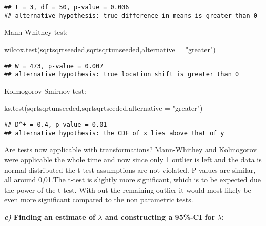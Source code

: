\documentclass[
]{article}
\newenvironment{Shaded}{\begin{snugshade}}{\end{snugshade}}
\newcommand{\AttributeTok}[1]{\textcolor[rgb]{0.77,0.63,0.00}{#1}}
\newcommand{\FunctionTok}[1]{\textcolor[rgb]{0.00,0.00,0.00}{#1}}
\newcommand{\NormalTok}[1]{#1}
\newcommand{\StringTok}[1]{\textcolor[rgb]{0.31,0.60,0.02}{#1}}
\begin{document}
\begin{verbatim}
## t = 3, df = 50, p-value = 0.006
## alternative hypothesis: true difference in means is greater than 0
\end{verbatim}

Mann-Whitney test:

\begin{Shaded}
\begin{Highlighting}[]
\FunctionTok{wilcox.test}\NormalTok{(sqrtsqrtseeded,sqrtsqrtunseeded,}\AttributeTok{alternative =} \StringTok{"greater"}\NormalTok{)}
\end{Highlighting}
\end{Shaded}

\begin{verbatim}
## W = 473, p-value = 0.007
## alternative hypothesis: true location shift is greater than 0
\end{verbatim}

Kolmogorov-Smirnov test:

\begin{Shaded}
\begin{Highlighting}[]
\FunctionTok{ks.test}\NormalTok{(sqrtsqrtunseeded,sqrtsqrtseeded,}\AttributeTok{alternative =} \StringTok{"greater"}\NormalTok{)}
\end{Highlighting}
\end{Shaded}

\begin{verbatim}
## D^+ = 0.4, p-value = 0.01
## alternative hypothesis: the CDF of x lies above that of y
\end{verbatim}

Are tests now applicable with transformations? Mann-Whithey and
Kolmogorov were applicable the whole time and now since only 1 outlier
is left and the data is normal distributed the t-test assumptions are
not violated. P-values are similar, all around 0,01.The t-test is
slightly more significant, which is to be expected due the power of the
t-test. With out the remaining outlier it would most likely be even more
significant compared to the non parametric tests.

\textbf{\emph{c)}} \textbf{Finding an estimate of \(\lambda\) and
constructing a 95\%-CI for \(\lambda\):}
\end{document}

